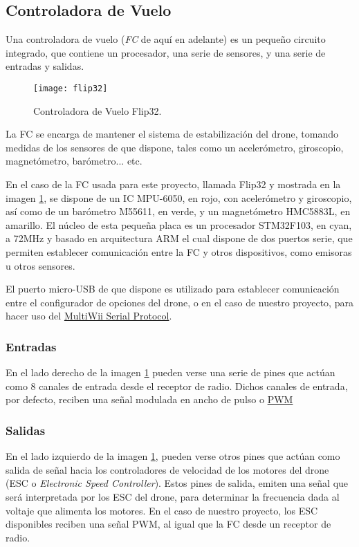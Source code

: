 \subsection{Controladora de Vuelo}

Una controladora de vuelo (\textit{FC} de aquí en adelante) es un pequeño circuito integrado, que contiene un procesador, una serie de sensores, y una serie de entradas y salidas. 
\begin{figure}
\centering
\texttt{[image: flip32]}
\caption{Controladora de Vuelo Flip32.}\label{fig:fc}
\end{figure}
La FC se encarga de mantener el sistema de estabilización del drone, tomando medidas de los sensores de que dispone, tales como un acelerómetro, giroscopio, magnetómetro, barómetro... etc. 

En el caso de la FC usada para este proyecto, llamada Flip32 y mostrada en la imagen \ref{fig:fc}, se dispone de un IC MPU-6050, en rojo, con acelerómetro y giroscopio, así como de un barómetro M55611, en verde, y un magnetómetro HMC5883L, en amarillo.
El núcleo de esta pequeña placa es un procesador STM32F103, en cyan, a 72MHz y basado en arquitectura ARM el cual dispone de dos puertos serie, que permiten establecer comunicación entre la FC y otros dispositivos, como emisoras u otros sensores.

El puerto micro-USB de que dispone es utilizado para establecer comunicación entre el configurador de opciones del drone, o en el caso de nuestro proyecto, para hacer uso del \hyperref[subsec:MSP]{MultiWii Serial Protocol}. 


\subsubsection{Entradas}
En el lado derecho de la imagen \ref{fig:fc} pueden verse una serie de pines que actúan como 8 canales de entrada desde el receptor de radio.
Dichos canales de entrada, por defecto, reciben una señal modulada en ancho de pulso o \hyperref[subsec:PWM]{PWM}

 

\subsubsection{Salidas}
En el lado izquierdo de la imagen \ref{fig:fc}, pueden verse otros pines que actúan como salida de señal hacia los controladores de velocidad de los motores del drone (ESC o \textit{Electronic Speed Controller}).
Estos pines de salida, emiten una señal que será interpretada por los ESC del drone, para determinar la frecuencia dada al voltaje que alimenta los motores. En el caso de nuestro proyecto, los ESC disponibles reciben una señal PWM, al igual que la FC desde un receptor de radio.

